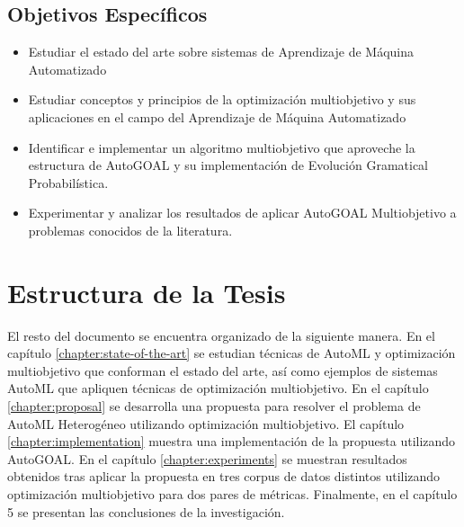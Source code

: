 \subsection*{Objetivos Espec\'ificos}
\begin{itemize}
    \item Estudiar el estado del arte sobre sistemas de Aprendizaje de M\'aquina Automatizado
    \item Estudiar conceptos y principios de la optimizaci\'on multiobjetivo y sus aplicaciones en el campo del Aprendizaje de M\'aquina Automatizado
    \item Identificar e implementar un algoritmo multiobjetivo que aproveche la estructura de AutoGOAL y su implementaci\'on de Evoluci\'on Gramatical Probabil\'istica.
    \item Experimentar y analizar los resultados de aplicar AutoGOAL Multiobjetivo a problemas conocidos de la literatura.
\end{itemize}

\section*{Estructura de la Tesis}
El resto del documento se encuentra organizado de la siguiente manera. En el cap\'itulo \ref{chapter:state-of-the-art} se estudian t\'ecnicas de AutoML y optimizaci\'on multiobjetivo que conforman el estado del arte, as\'i como ejemplos de sistemas AutoML que apliquen t\'ecnicas de optimizaci\'on multiobjetivo. En el cap\'itulo \ref{chapter:proposal} se desarrolla una propuesta para resolver el problema de AutoML Heterog\'eneo utilizando optimizaci\'on multiobjetivo. El cap\'itulo \ref{chapter:implementation} muestra una implementaci\'on de la propuesta utilizando AutoGOAL. En el cap\'itulo \ref{chapter:experiments} se muestran resultados obtenidos tras aplicar la propuesta en tres corpus de datos distintos utilizando optimizaci\'on multiobjetivo para dos pares de m\'etricas. 
Finalmente, en el cap\'itulo 5 se presentan las conclusiones de la investigaci\'on.
